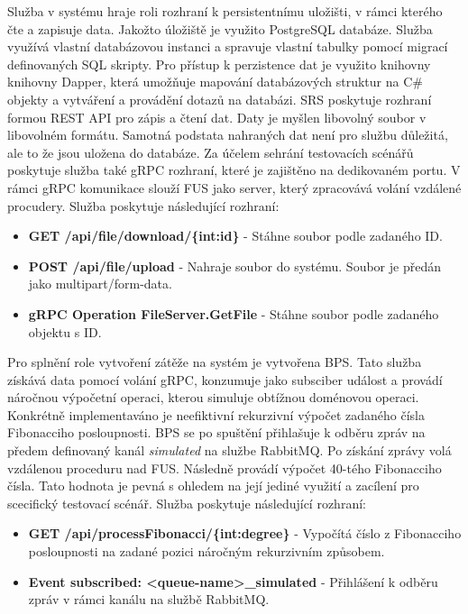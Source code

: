 
Služba v systému hraje roli rozhraní k persistentnímu uložišti, v rámci kterého čte a zapisuje data. Jakožto úložiště je využito PostgreSQL databáze. Služba využívá vlastní databázovou instanci a spravuje vlastní tabulky pomocí migrací definovaných SQL skripty. Pro přístup k perzistence dat je využito knihovny knihovny Dapper, která umožňuje mapování databázových struktur na C\# objekty a vytváření a provádění dotazů na databázi. SRS poskytuje rozhraní formou REST API pro zápis a čtení dat. Daty je myšlen libovolný soubor v libovolném formátu. Samotná podstata nahraných dat není pro službu důležitá, ale to že jsou uložena do databáze. Za účelem sehrání testovacích scénářů poskytuje služba také gRPC rozhraní, které je zajištěno na dedikovaném portu. V rámci gRPC komunikace slouží FUS jako server, který zpracovává volání vzdálené procudery. Služba poskytuje následující rozhraní:

\begin{itemize}
    \item \textbf{GET /api/file/download/\{int:id\}} - Stáhne soubor podle zadaného ID.
    \item \textbf{POST /api/file/upload} - Nahraje soubor do systému. Soubor je předán jako multipart/form-data.
    \item \textbf{gRPC Operation FileServer.GetFile} - Stáhne soubor podle zadaného objektu s ID.
\end{itemize}


Pro splnění role vytvoření zátěže na systém je vytvořena BPS. Tato služba získává data pomocí volání gRPC, konzumuje jako subsciber událost a provádí náročnou výpočetní operaci, kterou simuluje obtížnou doménovou operaci. Konkrétně implementaváno je neefiktivní rekurzivní výpočet zadaného čísla Fibonacciho posloupnosti. BPS se po spuštění přihlašuje k odběru zpráv na předem definovaný kanál \emph{simulated} na službe RabbitMQ. Po získání zprávy volá vzdálenou proceduru nad FUS. Následně provádí výpočet 40-tého Fibonacciho čísla. Tato hodnota je pevná s ohledem na její jediné využití a zacílení pro scecifický testovací scénář. Služba poskytuje následující rozhraní:

\begin{itemize}
    \item \textbf{GET /api/processFibonacci/\{int:degree\}} - Vypočítá číslo z Fibonacciho posloupnosti na zadané pozici náročným rekurzivním způsobem.
    \item \textbf{Event subscribed: <queue-name>\_simulated} - Přihlášení k odběru zpráv v rámci kanálu na službě RabbitMQ.
\end{itemize}

